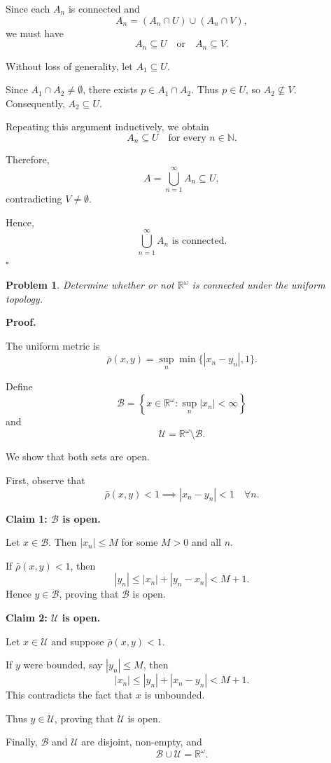 \documentclass[11pt,a4paper]{article}
\newcommand{\N}{\mathbb{N}}
\newcommand{\Rw}{\mathbb{R}^{\omega}}
\newcommand{\Bdd}{\mathcal{B}}
\newcommand{\Unb}{\mathcal{U}}
\newtheorem*{problem}{Problem}
\begin{document}
Since each $A_n$ is connected and
\[
A_n=(A_n\cap U)\cup(A_n\cap V),
\]
we must have
\[
A_n\subseteq U
\quad\text{or}\quad
A_n\subseteq V.
\]

Without loss of generality, let $A_1\subseteq U$.

Since $A_1\cap A_2\neq\emptyset$, there exists
$p\in A_1\cap A_2$. Thus $p\in U$, so
$A_2\not\subseteq V$. Consequently,
$A_2\subseteq U$.

Repeating this argument inductively, we obtain
\[
A_n\subseteq U
\quad\text{for every }n\in\N.
\]

Therefore,
\[
A=\bigcup_{n=1}^{\infty}A_n\subseteq U,
\]
contradicting $V\neq\emptyset$.

Hence,
\[
\boxed{\bigcup_{n=1}^{\infty}A_n
\text{ is connected.}}
\]
\hfill $\square$

\vspace{0.5cm}


\begin{problem}
Determine whether or not $\Rw$ is connected
under the uniform topology.
\end{problem}

\textbf{Proof.}

The uniform metric is
\[
\bar{\rho}(x,y)
=\sup_n\min\{|x_n-y_n|,1\}.
\]

Define
\[
\Bdd=
\left\{x\in\Rw:\sup_n|x_n|<\infty\right\}
\]
and
\[
\Unb=\Rw\setminus\Bdd.
\]

We show that both sets are open.

First, observe that
\[
\bar{\rho}(x,y)<1
\implies |x_n-y_n|<1
\quad\forall n.
\]

\textbf{Claim 1: $\Bdd$ is open.}

Let $x\in\Bdd$. Then $|x_n|\leq M$ for
some $M>0$ and all $n$.

If $\bar{\rho}(x,y)<1$, then
\[
|y_n|\leq |x_n|+|y_n-x_n|<M+1.
\]
Hence $y\in\Bdd$, proving that $\Bdd$ is open.

\textbf{Claim 2: $\Unb$ is open.}

Let $x\in\Unb$ and suppose
$\bar{\rho}(x,y)<1$.

If $y$ were bounded, say $|y_n|\leq M$,
then
\[
|x_n|\leq |y_n|+|x_n-y_n|<M+1.
\]
This contradicts the fact that $x$ is unbounded.

Thus $y\in\Unb$, proving that $\Unb$ is open.

Finally, $\Bdd$ and $\Unb$ are disjoint,
non-empty, and
\[
\Bdd\cup\Unb=\Rw.
\]
\end{document}
